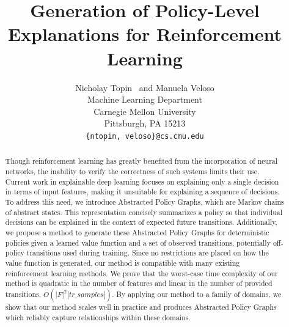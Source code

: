 \documentclass[letterpaper]{article} %
\begin{document}
%
\title{Generation of Policy-Level Explanations for Reinforcement Learning}
\author{
Nicholay Topin \ and Manuela Veloso \\
Machine Learning Department\\
Carnegie Mellon University\\
Pittsburgh, PA 15213 \\
\texttt{\{ntopin, veloso\}@cs.cmu.edu} \\
}
\maketitle
\begin{abstract}
Though reinforcement learning has greatly benefited from the incorporation of neural networks, the inability to verify the correctness of such systems limits their use. 
Current work in explainable deep learning focuses on explaining only a single decision in terms of input features, making it unsuitable for explaining a sequence of decisions. 
To address this need, we introduce Abstracted Policy Graphs, which are Markov chains of abstract states. 
This representation concisely summarizes a policy so that individual decisions can be explained in the context of expected future transitions. 
Additionally, we propose a method to generate these Abstracted Policy Graphs for deterministic policies given a learned value function and a set of observed transitions, potentially off-policy transitions used during training. 
Since no restrictions are placed on how the value function is generated, our method is compatible with many existing reinforcement learning methods. 
We prove that the worst-case time complexity of our method is quadratic in the number of features and linear in the number of provided transitions, $O(|F|^2 |tr\_samples|)$. 
By applying our method to a family of domains, we show that our method scales well in practice and produces Abstracted Policy Graphs which reliably capture relationships within these domains.
\end{abstract}
\end{document}
